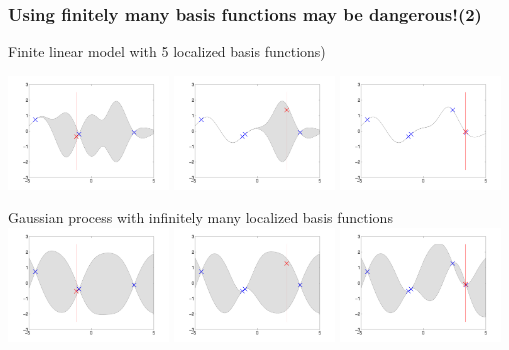 \begin{frame}
\frametitle{\!\!\!Using finitely many basis functions may be dangerous!(2)}

Finite linear model with 5 localized basis functions)

\includegraphics[width=0.32\textwidth]{seq_linear_M4.pdf}
\includegraphics[width=0.32\textwidth]{seq_linear_M5.pdf}
\includegraphics[width=0.32\textwidth]{seq_linear_M6.pdf}

Gaussian process with infinitely many localized basis functions
\includegraphics[width=0.32\textwidth]{seq_fullGP_M4.pdf}
\includegraphics[width=0.32\textwidth]{seq_fullGP_M5.pdf}
\includegraphics[width=0.32\textwidth]{seq_fullGP_M6.pdf}
\end{frame}


